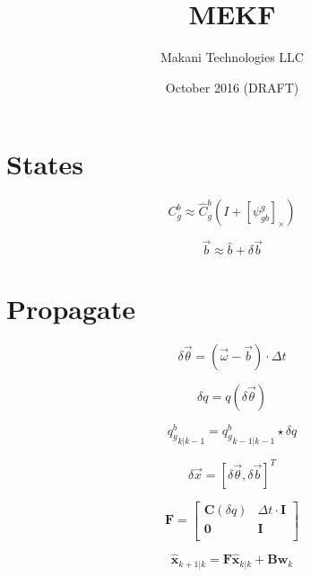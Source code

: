 \documentclass[11pt]{amsart}
\title{MEKF}
\author{Makani Technologies LLC}
\date{October 2016\; (DRAFT)}
\begin{document}
\maketitle

\section{States}

\begin{equation}
  C_g^b \approx \hat C_g^b (I + [\psi_{gb}^g]_{\times})
\end{equation}

\begin{equation}
  \vec{b} \approx \hat{b} + \delta \vec{b}
\end{equation}

\section{Propagate}

\begin{equation}
  \delta \vec{\theta} = (\vec{\omega} - \vec{b}) \cdot \Delta t
\end{equation}

\begin{equation}
  \delta q = q(\delta \vec{\theta})
\end{equation}

\begin{equation}
  {q_g^b}_{k|k-1} = {q_g^b}_{k-1|k-1} \star \delta q
\end{equation}


\begin{equation}
  \delta \vec{x} = [\delta \vec{\theta}, \delta \vec{b}]^T
\end{equation}

\begin{equation}
  \mathbf{F} = \begin{bmatrix}
    \mathbf{C}(\delta q) & \Delta t \cdot \mathbf{I} \\
    \mathbf{0}           & \mathbf{I} \\
  \end{bmatrix}
\end{equation}

\begin{equation}
  \mathbf{\hat{x}}_{k+1|k} = \mathbf{F} \mathbf{\hat{x}}_{k|k} +
                             \mathbf{B} \mathbf{w}_{k}
\end{equation}
\end{document}
